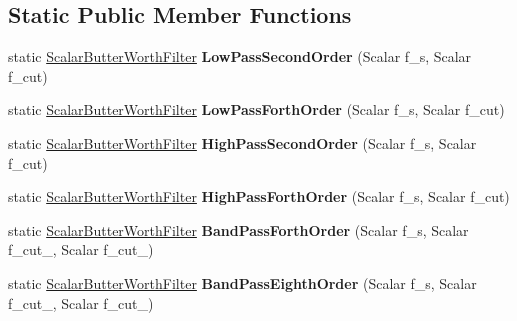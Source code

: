 \subsection*{Static Public Member Functions}
\begin{DoxyCompactItemize}
\item 
static \hyperlink{classow__core_1_1ScalarButterWorthFilter}{Scalar\+Butter\+Worth\+Filter} {\bfseries Low\+Pass\+Second\+Order} (Scalar f\+\_\+s, Scalar f\+\_\+cut)\hypertarget{classow__core_1_1ScalarButterWorthFilter_a65ef33ac8c066c5d764ed16129d2d808}{}\label{classow__core_1_1ScalarButterWorthFilter_a65ef33ac8c066c5d764ed16129d2d808}

\item 
static \hyperlink{classow__core_1_1ScalarButterWorthFilter}{Scalar\+Butter\+Worth\+Filter} {\bfseries Low\+Pass\+Forth\+Order} (Scalar f\+\_\+s, Scalar f\+\_\+cut)\hypertarget{classow__core_1_1ScalarButterWorthFilter_a059bdfd90581f17e3d85927c6c728018}{}\label{classow__core_1_1ScalarButterWorthFilter_a059bdfd90581f17e3d85927c6c728018}

\item 
static \hyperlink{classow__core_1_1ScalarButterWorthFilter}{Scalar\+Butter\+Worth\+Filter} {\bfseries High\+Pass\+Second\+Order} (Scalar f\+\_\+s, Scalar f\+\_\+cut)\hypertarget{classow__core_1_1ScalarButterWorthFilter_a98eb530645e14cad3555b45bf98c405a}{}\label{classow__core_1_1ScalarButterWorthFilter_a98eb530645e14cad3555b45bf98c405a}

\item 
static \hyperlink{classow__core_1_1ScalarButterWorthFilter}{Scalar\+Butter\+Worth\+Filter} {\bfseries High\+Pass\+Forth\+Order} (Scalar f\+\_\+s, Scalar f\+\_\+cut)\hypertarget{classow__core_1_1ScalarButterWorthFilter_a8dc3d78599747584a6aabac58c2572e3}{}\label{classow__core_1_1ScalarButterWorthFilter_a8dc3d78599747584a6aabac58c2572e3}

\item 
static \hyperlink{classow__core_1_1ScalarButterWorthFilter}{Scalar\+Butter\+Worth\+Filter} {\bfseries Band\+Pass\+Forth\+Order} (Scalar f\+\_\+s, Scalar f\+\_\+cut\+\_, Scalar f\+\_\+cut\+\_)\hypertarget{classow__core_1_1ScalarButterWorthFilter_a60315052d90ae854c642ccbcf68fd814}{}\label{classow__core_1_1ScalarButterWorthFilter_a60315052d90ae854c642ccbcf68fd814}

\item 
static \hyperlink{classow__core_1_1ScalarButterWorthFilter}{Scalar\+Butter\+Worth\+Filter} {\bfseries Band\+Pass\+Eighth\+Order} (Scalar f\+\_\+s, Scalar f\+\_\+cut\+\_, Scalar f\+\_\+cut\+\_)\hypertarget{classow__core_1_1ScalarButterWorthFilter_a4478fc17122836265ec33e57b89d11de}{}\label{classow__core_1_1ScalarButterWorthFilter_a4478fc17122836265ec33e57b89d11de}


\end{DoxyCompactItemize}

